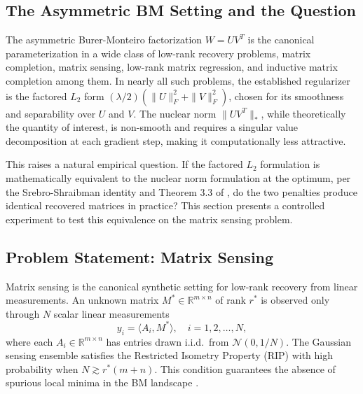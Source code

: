 \subsection{The Asymmetric BM Setting and the Question}
The asymmetric Burer-Monteiro factorization $W = UV^T$ is the canonical parameterization in a wide class of low-rank recovery problems, matrix completion, matrix sensing, low-rank matrix regression, and inductive matrix completion among them. In nearly all such problems, the established regularizer is the factored $L_2$ form $(\lambda/2)(\|U\|_F^2 + \|V\|_F^2)$, chosen for its smoothness and separability over $U$ and $V$. The nuclear norm $\|UV^T\|_*$, while theoretically the quantity of interest, is non-smooth and requires a singular value decomposition at each gradient step, making it computationally less attractive.

This raises a natural empirical question. If the factored $L_2$ formulation is mathematically equivalent to the nuclear norm formulation at the optimum, per the Srebro-Shraibman identity and Theorem 3.3 of \cite{kobayashi2024lowrank}, do the two penalties produce identical recovered matrices in practice? This section presents a controlled experiment to test this equivalence on the matrix sensing problem.

\subsection{Problem Statement: Matrix Sensing}
Matrix sensing is the canonical synthetic setting for low-rank recovery from linear measurements. An unknown matrix $M^* \in \mathbb{R}^{m \times n}$ of rank $r^*$ is observed only through $N$ scalar linear measurements
\begin{equation}
    y_i = \langle A_i, M^* \rangle, \quad i = 1, 2, \dots, N,
\end{equation}
where each $A_i \in \mathbb{R}^{m \times n}$ has entries drawn i.i.d.\ from $\mathcal{N}(0, 1/N)$. The Gaussian sensing ensemble satisfies the Restricted Isometry Property (RIP) with high probability when $N \gtrsim r^*(m+n)$. This condition guarantees the absence of spurious local minima in the BM landscape \cite{rechtfazelparrilo2010, tu2016procrustes}.


